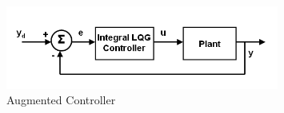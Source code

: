 \documentclass{article}
\begin{document}
\begin{figure}[h]
\includegraphics[width=0.8\textwidth]{LQGIntegralController.png}
\centering
\caption{Augmented Controller}
\label{fig:LQGBlockDiagram}
\end{figure}
\end{document}
